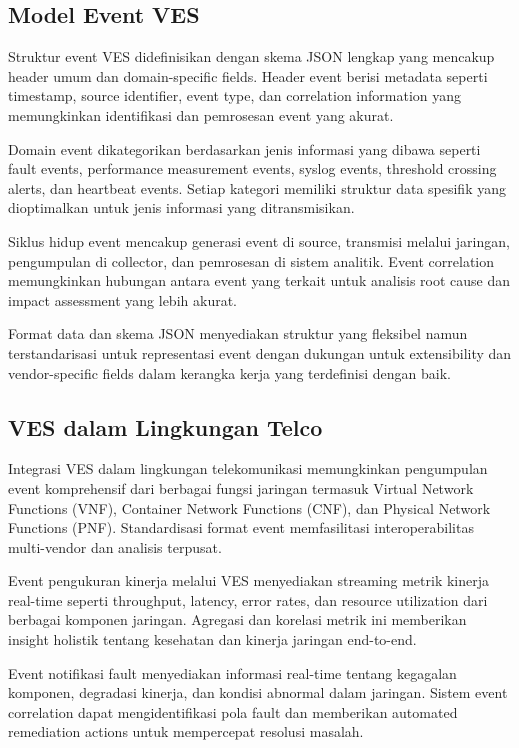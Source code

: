 \subsection{Model Event VES}

Struktur event VES didefinisikan dengan skema JSON lengkap yang mencakup header umum dan domain-specific fields. Header event berisi metadata seperti timestamp, source identifier, event type, dan correlation information yang memungkinkan identifikasi dan pemrosesan event yang akurat.

Domain event dikategorikan berdasarkan jenis informasi yang dibawa seperti fault events, performance measurement events, syslog events, threshold crossing alerts, dan heartbeat events. Setiap kategori memiliki struktur data spesifik yang dioptimalkan untuk jenis informasi yang ditransmisikan.

Siklus hidup event mencakup generasi event di source, transmisi melalui jaringan, pengumpulan di collector, dan pemrosesan di sistem analitik. Event correlation memungkinkan hubungan antara event yang terkait untuk analisis root cause dan impact assessment yang lebih akurat.

Format data dan skema JSON menyediakan struktur yang fleksibel namun terstandarisasi untuk representasi event dengan dukungan untuk extensibility dan vendor-specific fields dalam kerangka kerja yang terdefinisi dengan baik.

\subsection{VES dalam Lingkungan Telco}

Integrasi VES dalam lingkungan telekomunikasi memungkinkan pengumpulan event komprehensif dari berbagai fungsi jaringan termasuk Virtual Network Functions (VNF), Container Network Functions (CNF), dan Physical Network Functions (PNF). Standardisasi format event memfasilitasi interoperabilitas multi-vendor dan analisis terpusat.

Event pengukuran kinerja melalui VES menyediakan streaming metrik kinerja real-time seperti throughput, latency, error rates, dan resource utilization dari berbagai komponen jaringan. Agregasi dan korelasi metrik ini memberikan insight holistik tentang kesehatan dan kinerja jaringan end-to-end.

Event notifikasi fault menyediakan informasi real-time tentang kegagalan komponen, degradasi kinerja, dan kondisi abnormal dalam jaringan. Sistem event correlation dapat mengidentifikasi pola fault dan memberikan automated remediation actions untuk mempercepat resolusi masalah.

